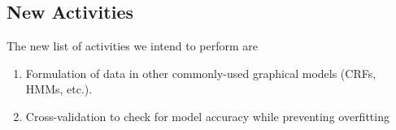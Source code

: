 \documentclass{article}
\begin{document}
\subsection{New Activities}
The new list of activities we intend to perform are
\begin{enumerate}
\item Formulation of data in other commonly-used graphical models (CRFs, HMMs, etc.).
\item Cross-validation to check for model accuracy while preventing overfitting
\end{enumerate}



\end{document}
